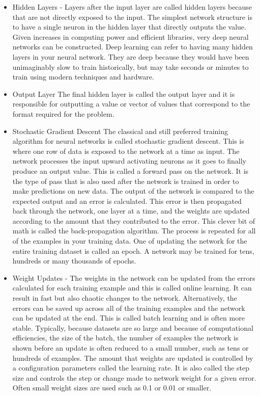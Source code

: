 \documentclass[12pt]{article}
\begin{document}
\begin{itemize}
\item
Hidden Layers - Layers after the input layer are called hidden layers because that are not directly exposed to the input. The simplest network structure is to have a single neuron in the hidden layer that directly outputs the value. Given increases in computing power and efficient libraries, very deep neural networks can be constructed. Deep learning can refer to having many hidden layers in your neural network. They are deep because they would have been unimaginably slow to train historically, but may take seconds or minutes to train using modern techniques and hardware.

\item
Output Layer
The final hidden layer is called the output layer and it is responsible for outputting a value or vector of values that correspond to the format required for the problem.

\item
Stochastic Gradient Descent
The classical and still preferred training algorithm for neural networks is called stochastic gradient descent. This is where one row of data is exposed to the network at a time as input. The network processes the input upward activating neurons as it goes to finally produce an output value. This is called a forward pass on the network. It is the type of pass that is also used after the network is trained in order to make predictions on new data. The output of the network is compared to the expected output and an error is calculated. This error is then propagated back through the network, one layer at a time, and the weights are updated according to the amount that they contributed to the error. This clever bit of math is called the back-propagation algorithm. The process is repeated for all of the examples in your training data. One of updating the network for the entire training dataset is called an epoch. A network may be trained for tens, hundreds or many thousands of epochs.

\item
Weight Updates - The weights in the network can be updated from the errors calculated for each training example and this is called online learning. It can result in fast but also chaotic changes to the network. Alternatively, the errors can be saved up across all of the training examples and the network can be updated at the end. This is called batch learning and is often more stable. Typically, because datasets are so large and because of computational efficiencies, the size of the batch, the number of examples the network is shown before an update is often reduced to a small number, such as tens or hundreds of examples. The amount that weights are updated is controlled by a configuration parameters called the learning rate. It is also called the step size and controls the step or change made to network weight for a given error. Often small weight sizes are used such as 0.1 or 0.01 or smaller.


\end{itemize}
\end{document}
